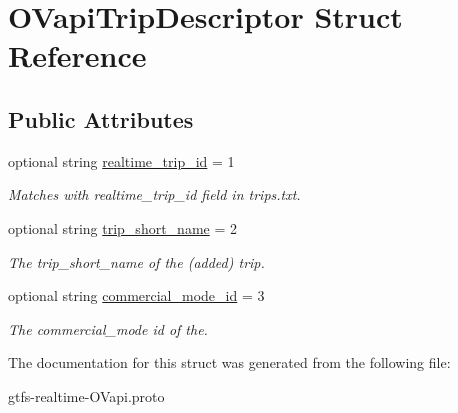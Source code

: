 \hypertarget{structOVapiTripDescriptor}{}\section{O\+Vapi\+Trip\+Descriptor Struct Reference}
\label{structOVapiTripDescriptor}
\subsection*{Public Attributes}
\begin{DoxyCompactItemize}
\item 
optional string \hyperlink{structOVapiTripDescriptor_a3416e91d37e8480fbda0e450d594f0f3}{realtime\+\_\+trip\+\_\+id} = 1\hypertarget{structOVapiTripDescriptor_a3416e91d37e8480fbda0e450d594f0f3}{}\label{structOVapiTripDescriptor_a3416e91d37e8480fbda0e450d594f0f3}

\begin{DoxyCompactList}\small\item\em Matches with realtime\+\_\+trip\+\_\+id field in trips.\+txt. \end{DoxyCompactList}\item 
optional string \hyperlink{structOVapiTripDescriptor_ac34427553a21d032021fde0f3184cc6c}{trip\+\_\+short\+\_\+name} = 2\hypertarget{structOVapiTripDescriptor_ac34427553a21d032021fde0f3184cc6c}{}\label{structOVapiTripDescriptor_ac34427553a21d032021fde0f3184cc6c}

\begin{DoxyCompactList}\small\item\em The trip\+\_\+short\+\_\+name of the (added) trip. \end{DoxyCompactList}\item 
optional string \hyperlink{structOVapiTripDescriptor_a705aae00b6b9e513012dfa9406e6caec}{commercial\+\_\+mode\+\_\+id} = 3\hypertarget{structOVapiTripDescriptor_a705aae00b6b9e513012dfa9406e6caec}{}\label{structOVapiTripDescriptor_a705aae00b6b9e513012dfa9406e6caec}

\begin{DoxyCompactList}\small\item\em The commercial\+\_\+mode id of the. \end{DoxyCompactList}\end{DoxyCompactItemize}


The documentation for this struct was generated from the following file\+:\begin{DoxyCompactItemize}
\item 
gtfs-\/realtime-\/\+O\+Vapi.\+proto\end{DoxyCompactItemize}
